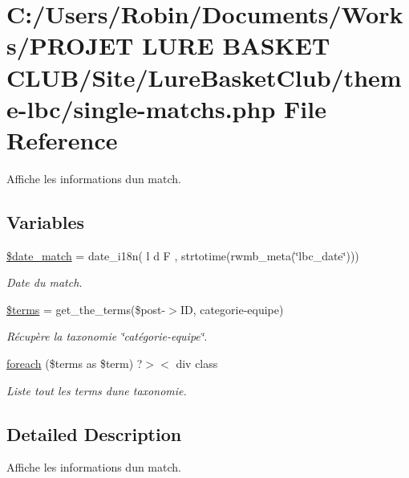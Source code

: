 \hypertarget{single-matchs_8php}{}\section{C\+:/\+Users/\+Robin/\+Documents/\+Works/\+P\+R\+O\+J\+ET L\+U\+RE B\+A\+S\+K\+ET C\+L\+U\+B/\+Site/\+Lure\+Basket\+Club/theme-\/lbc/single-\/matchs.php File Reference}
\label{single-matchs_8php}


Affiche les informations d\textquotesingle{}un match.  


\subsection*{Variables}
\begin{DoxyCompactItemize}
\item 
\hyperlink{single-matchs_8php_a9dccec06b3547f7c82bc8ade68a042a5}{\$date\+\_\+match} = date\+\_\+i18n(\textquotesingle{} l d F \textquotesingle{}, strtotime(rwmb\+\_\+meta(\char`\"{}lbc\+\_\+date\char`\"{})))
\begin{DoxyCompactList}\small\item\em Date du match. \end{DoxyCompactList}\item 
\hyperlink{single-matchs_8php_ad6d756efb764174cfe7a6e9abc97e3eb}{\$terms} = get\+\_\+the\+\_\+terms(\$post-\/$>$ID, \textquotesingle{}categorie-\/equipe\textquotesingle{})
\begin{DoxyCompactList}\small\item\em Récupère la taxonomie \char`\"{}catégorie-\/equipe\char`\"{}. \end{DoxyCompactList}\item 
\hyperlink{single-matchs_8php_acef14cb9dd3a31dcc9b59c773f76807e}{foreach} (\$terms as \$term) ?$>$$<$ div class
\begin{DoxyCompactList}\small\item\em Liste tout les terms d\textquotesingle{}une taxonomie. \end{DoxyCompactList}\end{DoxyCompactItemize}


\subsection{Detailed Description}
Affiche les informations d\textquotesingle{}un match. 

